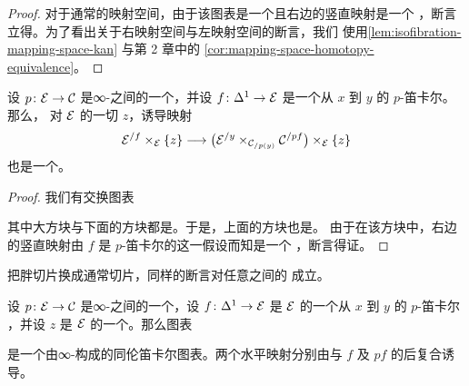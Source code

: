 \begin{proof}
对于通常的映射空间，由于该图表是一个\trPullback{}且右边的竖直映射是一个%
\trKanFibration{}，断言立得。为了看出关于右映射空间与左映射空间的断言，我们
使用\cref{lem:isofibration-mapping-space-kan} 与第 2 章中的%
\cref{cor:mapping-space-homotopy-equivalence}。
\end{proof}

\begin{lemma}\label{lem:cartesian-fibre-trivial-fibration}
设 $p\colon \mathcal{E} \to \mathcal{C}$ 是∞-\trCategories{}之间的一个\trInnerFibration{}，并设
$f\colon \Delta^1 \to \mathcal{E}$ 是一个从 $x$ 到 $y$ 的 $p$-笛卡尔\trMorphism{}。那么，
对 $\mathcal{E}$ 的一切\trObject{} $z$，诱导映射
\[
\mathcal{E}^{/f} \times_{\mathcal{E}} \{z\} \longrightarrow
\bigl(\mathcal{E}^{/y} \times_{\mathcal{C}_{/p(y)}} \mathcal{C}^{/pf}\bigr) \times_{\mathcal{E}} \{z\}
\]
也是一个\trTrivialFibration{}。
\end{lemma}

\begin{proof}
我们有交换图表
\begin{center}
\end{center}
其中大方块与下面的方块都是\trPullback{}。于是，上面的方块也是\trPullback{}。
由于在该方块中，右边的竖直映射由 $f$ 是 $p$-笛卡尔的这一假设而知是一个%
\trTrivialFibration{}，断言得证。
\end{proof}

\begin{remark}\label{rem:cartesian-ordinary-slice}
把胖切片换成通常切片，同样的断言对任意\trSimplicialSets{}之间的%
\trInnerFibration{}成立。
\end{remark}

\begin{corollary}\label{cor:cartesian-map-into-fibre}
设 $p\colon \mathcal{E} \to \mathcal{C}$ 是∞-\trCategories{}之间的一个\trInnerFibration{}，设
$f\colon \Delta^1 \to \mathcal{E}$ 是 $\mathcal{E}$ 的一个从 $x$ 到 $y$ 的 $p$-笛卡尔%
\trMorphism{}，并设 $z$ 是 $\mathcal{E}$ 的一个\trObject{}。那么图表
\begin{center}
\end{center}
是一个由∞-\trGroupoid{}构成的同伦笛卡尔图表。两个水平映射分别由与 $f$ 及
$pf$ 的后复合诱导。
\end{corollary}

